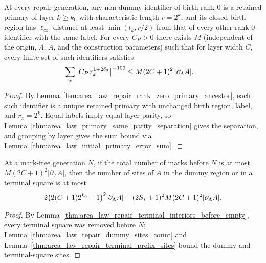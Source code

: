 \begin{lemma}
    \label{lem:area_law_two_family_primaries}
    \leanok
    At every repair generation, any non-dummy identifier of birth rank $0$ is a
    retained primary of layer $k\ge k_0$ with characteristic length $r=2^k$, and
    its closed birth region has $\ell_\infty$-distance at least $\min(t_k,r/2)$
    from that of every other rank-$0$ identifier with the same label. For every
    $C_P>0$ there exists $M$ (independent of the origin, $\Lambda$, $A$, and
    the construction parameters) such that for layer width $C$, every finite set
    of such identifiers satisfies
    \begin{align}
        \sum_x\bigl\lceil C_P\,r_x^{1+2\delta_0}\bigr\rceil^{-100}
         & \le M(2C+1)^2\,|\partial_\Lambda A|.\notag
    \end{align}
\end{lemma}
\begin{proof}
    \leanok
    By Lemma~\ref{lem:area_law_repair_rank_zero_primary_ancestor}, each such
    identifier is a unique retained primary with unchanged birth region, label,
    and $r_x=2^k$. Equal labels imply equal layer parity, so
    Lemma~\ref{thm:area_law_primary_same_parity_separation} gives the
    separation, and grouping by layer gives the sum bound via
    Lemma~\ref{thm:area_law_initial_primary_error_sum}.
\end{proof}

\begin{lemma}
    \label{lem:area_law_two_family_exceptional_sites}
    \leanok
    At a mark-free generation $N$, if the total number of marks before $N$ is at
    most $M(2C+1)^2|\partial_\Lambda A|$, then the number of sites of $A$ in the
    dummy region or in a terminal square is at most
    \begin{align}
        2\bigl(2(C+1)2^{k_0}+1\bigr)^2|\partial_\Lambda A|
        +(2S_*+1)^2M(2C+1)^2|\partial_\Lambda A|.\notag
    \end{align}
\end{lemma}
\begin{proof}
    \leanok
    By Lemma~\ref{thm:area_law_repair_terminal_interiors_before_empty}, every
    terminal square was removed before $N$;
    Lemma~\ref{thm:area_law_repair_dummy_sites_count} and
    Lemma~\ref{thm:area_law_repair_terminal_prefix_sites} bound the dummy and
    terminal-square sites.
\end{proof}

